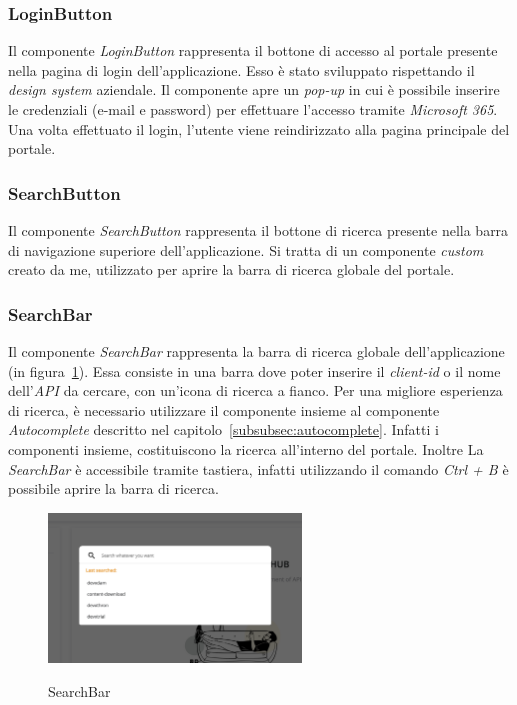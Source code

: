 \subsubsection{LoginButton}\label{subsubsec:login-button}
Il componente \textit{LoginButton} rappresenta il bottone di accesso al portale presente nella pagina di login dell'applicazione. Esso è stato sviluppato rispettando il \textit{design system} aziendale.
Il componente apre un \textit{pop-up} in cui è possibile inserire le credenziali (e-mail e password) per effettuare l'accesso tramite \textit{Microsoft 365}.
Una volta effettuato il login, l'utente viene reindirizzato alla pagina principale del portale.

\subsubsection{SearchButton}\label{subsubsec:search-button}
Il componente \textit{SearchButton} rappresenta il bottone di ricerca presente nella barra di navigazione superiore dell'applicazione.
Si tratta di un componente \textit{custom} creato da me, utilizzato per aprire la barra di ricerca globale del portale. 

\subsubsection{SearchBar}\label{subsubsec:search-bar}
Il componente \textit{SearchBar} rappresenta la barra di ricerca globale dell'applicazione (in figura~\ref{fig:search-bar}). 
Essa consiste in una barra dove poter inserire il \textit{client-id} o il nome dell'\textit{API} da cercare,
con un'icona di ricerca a fianco. Per una migliore esperienza di ricerca, è necessario utilizzare il componente insieme al componente \textit{Autocomplete} descritto nel capitolo~\ref{subsubsec:autocomplete}.
Infatti i componenti insieme, costituiscono la ricerca all'interno del portale. Inoltre La \textit{SearchBar} è accessibile tramite tastiera,
infatti utilizzando il comando \textit{Ctrl + B} è possibile aprire la barra di ricerca.\\

\begin{figure}[ht]
  \centering
  \includegraphics[width=0.6\textwidth, alt={Barra di ricerca globale dell'applicazione}]{images/frontend/SearchBar.jpg}
  \caption{SearchBar}\label{fig:search-bar}
\end{figure}
\pagebreak

